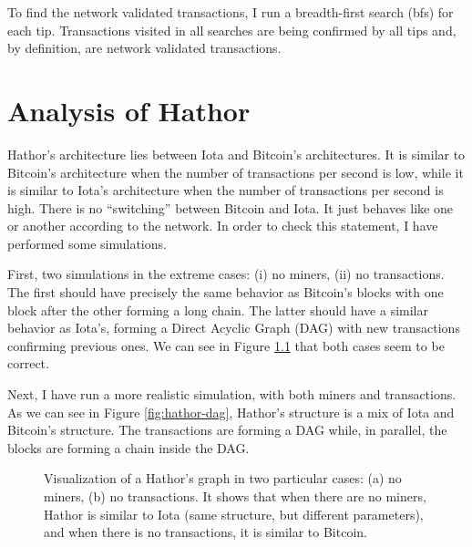 To find the network validated transactions, I run a breadth-first search (bfs) for each tip. Transactions visited in all searches are being confirmed by all tips and, by definition, are network validated transactions.



\chapter{Analysis of Hathor}


Hathor's architecture lies between Iota and Bitcoin's architectures. It is similar to Bitcoin's architecture when the number of transactions per second is low, while it is similar to Iota's architecture when the number of transactions per second is high. There is no ``switching'' between Bitcoin and Iota. It just behaves like one or another according to the network. In order to check this statement, I have performed some simulations.

First, two simulations in the extreme cases: (i) no miners, (ii) no transactions. The first should have precisely the same behavior as Bitcoin's blocks with one block after the other forming a long chain. The latter should have a similar behavior as Iota's, forming a Direct Acyclic Graph (DAG) with new transactions confirming previous ones. We can see in Figure \ref{fig:hathor-similarities} that both cases seem to be correct.

Next, I have run a more realistic simulation, with both miners and transactions. As we can see in Figure \ref{fig:hathor-dag}, Hathor's structure is a mix of Iota and Bitcoin's structure. The transactions are forming a DAG while, in parallel, the blocks are forming a chain inside the DAG.

\begin{figure}[!htb]
\centering
{}
\caption{Visualization of a Hathor's graph in two particular cases: (a) no miners, (b) no transactions. It shows that when there are no miners, Hathor is similar to Iota (same structure, but different parameters), and when there is no transactions, it is similar to Bitcoin.\label{fig:hathor-similarities}}
\end{figure}

